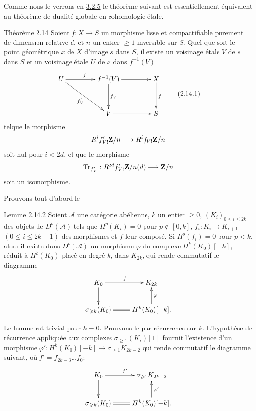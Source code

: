 \documentclass[10pt]{../fichiers-configuration-latex/smfart}
\begin{document}
Comme nous le verrons en \hyperref[XVIII.thm3.2.5]{3.2.5} le théorème suivant est
essentiellement équivalent au théorème de dualité globale en
cohomologie étale.

\begin{enonce*}{Théorème 2.14}
Soient $f:X\rightarrow S$ un morphisme lisse et compactifiable
purement de dimension relative $d$, et $n$ un entier $\geq 1$
inversible sur $S$. Quel que soit le point géométrique $x$ de $X$
d'image $s$ dans $S$, il existe un voisinage étale $V$ de $s$ dans $S$
et un voisinage étale $U$ de $x$ dans $f^{-1}(V)$
\begin{equation*}
\vcenter{
\xymatrix@C=1.5cm@R=1.25cm{
U \ar[rd]_{f'_V} \ar[r]^{j} & f^{-1}(V)   \ar[r] \ar[d]^{f_V}& X\ar[d]^{f}\\
                                             &     V           \ar[r]  & S
}}\tag{2.14.1}
\end{equation*}%
tel\pageoriginale que le morphisme 
$$
R^{i}f'_{V!}\mathbf{Z}/n\longrightarrow R^{i}f_{V!}\mathbf{Z}/n
$$
soit nul pour $i<2d$, et que le morphisme
$$
\operatorname{Tr}_{f'_{V}}:R^{2d}f'_{V!}\mathbf{Z}/n(d)\longrightarrow \mathbf{Z}/n
$$
soit un isomorphisme.
\end{enonce*}

Prouvons tout d'abord le

\begin{enonce*}{Lemme 2.14.2}
Soient $\mathcal{A}$ une catégorie abélienne, $k$ un entier $\geq 0$,
$(K_{i})_{0\leq i\leq 2k}$ des objets de $D^{b}(\mathcal{A})$ tels que
$H^{p}(K_{i})=0$ pour $p\not\in [0,k]$, $f_{i}:K_{i}\rightarrow
K_{i+1}$ $(0\leq i\leq 2k-1)$ des morphismes et $f$ leur composé. Si
$H^{p}(f_{i})=0$ pour $p<k$, alors il existe dans $D^{b}(\mathcal{A})$
un morphisme $\varphi$ du complexe $H^{k}(K_{0})[-k]$, réduit à
$H^{k}(K_{0})$ placé en degré $k$, dans $K_{2k}$, qui rende commutatif
le diagramme
$$
\xymatrix{
K_{0}  \ar[d]\ar[r]^{f} & K_{2k}\\
\sigma_{\geq k}(K_{0})  \ar@{=}[r] & H^{k}(K_{0})[-k] \ar[u]_{\varphi}.
}
$$
\end{enonce*}

Le lemme est trivial pour $k=0$. Prouvons-le par récurrence sur
$k$. L'hypothèse de récurrence appliquée aux complexes $\sigma_{\geq
1}(K_{i})[1]$ fournit l'existence d'un morphisme
$\varphi':H^{k}(K_{0})[-k]\rightarrow \sigma_{\geq 1}K_{2k-2}$ qui
rende commutatif le diagramme suivant, où $f'=f_{2k-3}\ldots f_{0}$:
$$
\xymatrix{
K_{0}  \ar[d]\ar[r]^{f'} & \sigma_{\geq 1}K_{2k-2}            \\
\sigma_{\geq k}(K_{0})  \ar@{=}[r] & H^{k}(K_{0})[-k]. \ar[u]_{\varphi'}
}
$$
\end{document}

